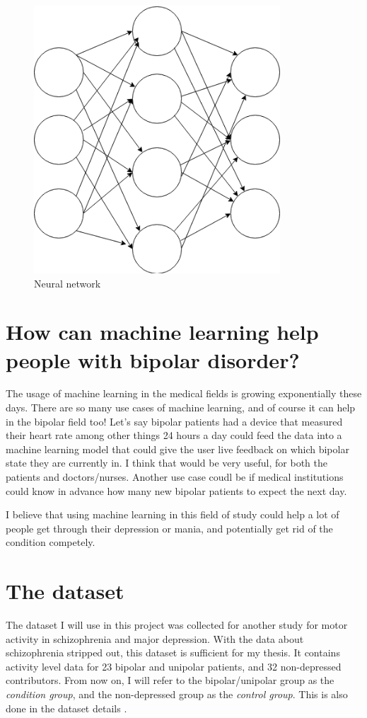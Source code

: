 \begin{figure}
    \includegraphics[height=10cm]{neural_net.png}
    \caption{Neural network}
    \label{figure:neural_net}
\end{figure}

\newpage
\section{How can machine learning help people with bipolar disorder?}
The usage of machine learning in the medical fields is growing exponentially these days. There are so many use cases of machine learning, and of course 
it can help in the bipolar field too! Let's say bipolar patients had a device that measured their heart rate among other things 24 hours a day could 
feed the data into a machine learning model that could give the user live feedback on which bipolar state they are currently in. I think that would be very 
useful, for both the patients and doctors/nurses. Another use case coudl be if medical institutions could know in advance how many new bipolar patients to 
expect the next day. 

I believe that using machine learning in this field of study could help a lot of people get through their depression or mania, and potentially get rid 
of the condition competely.

\section{The dataset}
The dataset I will use in this project \cite{dataset} was collected for another study for motor activity in schizophrenia and major depression. 
With the data about schizophrenia stripped out, this dataset is sufficient for my thesis. It contains activity level data for 23 bipolar and unipolar patients, 
and 32 non-depressed contributors. From now on, I will refer to the bipolar/unipolar group as the \textit{condition group}, and the non-depressed group as 
the \textit{control group}. This is also done in the dataset details \cite{dataset_details}.

